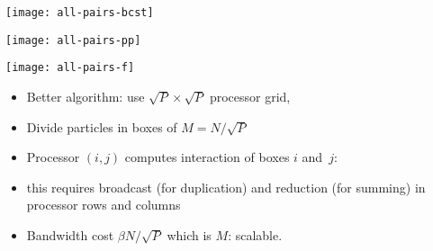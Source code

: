 
\begin{frame}
  \texttt{[image: all-pairs-bcst]}
\end{frame}

\begin{frame}
  \texttt{[image: all-pairs-pp]}
\end{frame}

\begin{frame}
  \texttt{[image: all-pairs-f]}
\end{frame}

\begin{frame}
  \begin{itemize}
  \item Better algorithm: use $\sqrt P\times\sqrt P$ processor grid,
  \item Divide particles in boxes of $M=N/\sqrt P$
  \item Processor $(i,j)$ computes interaction of boxes $i$ and~$j$:
  \item this requires broadcast (for duplication) and reduction (for
    summing) in processor rows and columns
  \item Bandwidth cost $\beta N/\sqrt P$ which is $M$: scalable.
  \end{itemize}
\end{frame}
